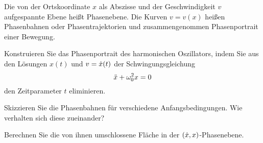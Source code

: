 \begin{atiTask}[
  title = Das Phasenportrait
]
  Die von der Ortskoordinate $x$ als Abszisse und der Geschwindigkeit $v$ aufgespannte Ebene heißt Phasenebene.
  Die Kurven $v=v(x)$ heißen Phasenbahnen oder Phasentrajektorien und zusammengenommen Phasenportrait einer Bewegung.
  \begin{atiSubtasks}
    \item{
      Konstruieren Sie das Phasenportrait des harmonischen Oszillators, indem Sie aus den Lösungen $x(t)$ und $v=\dot{x}(t)$ der Schwingungsgleichung
      \[
        \ddot{x} + \omega_0^2 x = 0
      \]
      den Zeitparameter $t$ eliminieren.
    }
    \item{
      Skizzieren Sie die Phasenbahnen für verschiedene Anfangsbedingungen.
      Wie verhalten sich diese zueinander?
    }
    \item{
      Berechnen Sie die von ihnen umschlossene Fläche in der $(\dot{x},x)$-Phasenebene.
    }
  \end{atiSubtasks}
\end{atiTask}